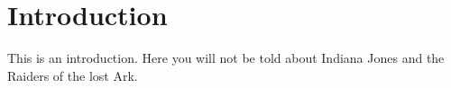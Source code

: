 \chapter{Introduction}
This is an introduction. 
Here you will not be told about Indiana Jones and the Raiders of the lost Ark.